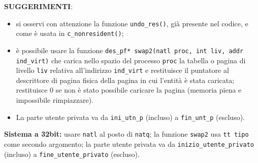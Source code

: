 {\bf SUGGERIMENTI}:
\begin{itemize}
  \item si osservi con attenzione la funzione \verb|undo_res()|,
gi\`a presente nel codice, e come \`e usata in \verb|c_nonresident()|;
  \item \`e possibile usare la funzione
  \verb|des_pf* swap2(natl proc, int liv, addr ind_virt)| che
  carica nello spazio del processo \verb|proc| la tabella o pagina di livello \verb|liv| relativa all'indirizzo \verb|ind_virt| e restituisce
  il puntatore al descrittore di pagina fisica della pagina in cui
  l'entit\`a \`e stata caricata; restituisce 0 se non \`e stato possibile
  caricare la pagina (memoria piena e impossibile rimpiazzare).
  \item La parte utente privata va da \verb|ini_utn_p| (incluso)
   a \verb|fin_unt_p| (escluso).
\end{itemize}
{\bf Sistema a 32bit:} usare \verb|natl| al posto di \verb|natq|;
la funzione \verb|swap2| usa \verb|tt tipo| come secondo argomento;
la parte utente privata va da \verb|inizio_utente_privato| (incluso)
a \verb|fine_utente_privato| (escluso).
